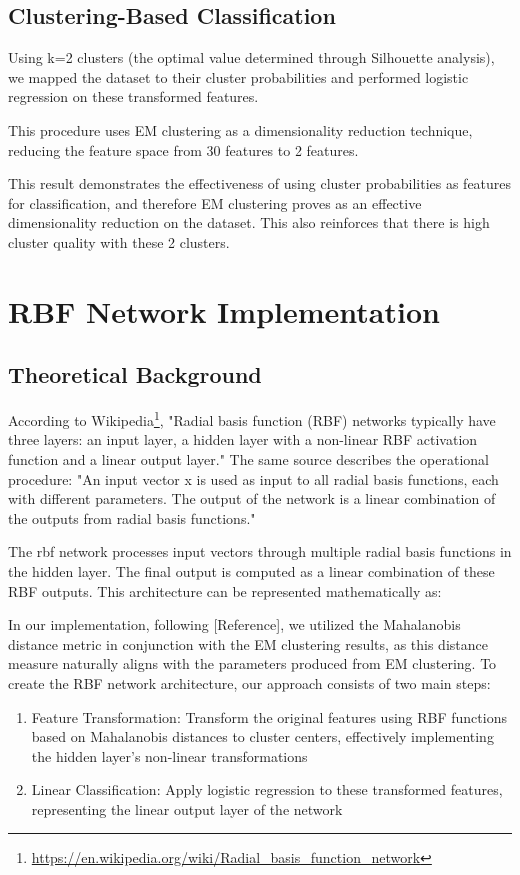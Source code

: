 \documentclass{article}
\begin{document}
\subsection{Clustering-Based Classification}
Using k=2 clusters (the optimal value determined through Silhouette analysis), we mapped the dataset to their cluster probabilities and performed logistic regression on these transformed features. 

This procedure uses EM clustering as a dimensionality reduction technique, reducing the feature space from 30 features to 2 features. 

This result demonstrates the effectiveness of using cluster probabilities as features for classification, and therefore EM clustering proves as an effective dimensionality reduction on the dataset. This also reinforces that there is high cluster quality with these 2 clusters. 

\section{RBF Network Implementation}
\subsection{Theoretical Background}
According to Wikipedia\footnote{\url{https://en.wikipedia.org/wiki/Radial_basis_function_network}}, "Radial basis function (RBF) networks typically have three layers: an input layer, a hidden layer with a non-linear RBF activation function and a linear output layer." The same source describes the operational procedure: "An input vector x is used as input to all radial basis functions, each with different parameters. The output of the network is a linear combination of the outputs from radial basis functions."

The rbf network processes input vectors through multiple radial basis functions in the hidden layer. The final output is computed as a linear combination of these RBF outputs. This architecture can be represented mathematically as:

In our implementation, following [Reference]\cite{rbf_reference}, we utilized the Mahalanobis distance metric in conjunction with the EM clustering results, as this distance measure naturally aligns with the parameters produced from EM clustering. To create the RBF network architecture, our approach consists of two main steps:

\begin{enumerate}
    \item Feature Transformation: Transform the original features using RBF functions based on Mahalanobis distances to cluster centers, effectively implementing the hidden layer's non-linear transformations
    \item Linear Classification: Apply logistic regression to these transformed features, representing the linear output layer of the network
\end{enumerate}
\end{document}
